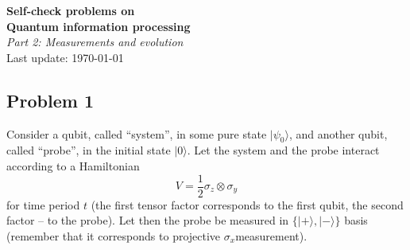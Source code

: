 \documentclass[a4paper,10pt]{article}
\newcommand{\ket}[1]{|#1\rangle}
\begin{document}
\begin{center}
\Large{{\bf Self-check problems on\\  Quantum information processing}\\{\it Part 2: Measurements and evolution}}\\
\vspace{5pt}
\large{Last update: \today}
\end{center}

\subsection*{Problem 1}
Consider a qubit, called ``system'', in some pure state $\ket{\psi_{0}}$, and another qubit, called ``probe'', in the initial state $\ket{0}$.
Let the system and the probe interact according to a Hamiltonian 
\begin{equation}
	V=\frac{1}{2}\sigma_{z}\otimes\sigma_{y}
\end{equation} 
for time period $t$ (the first tensor factor corresponds to the first qubit, the second factor -- to the probe).
Let then the probe be measured in $\{\ket{+}, \ket{-}\}$ basis (remember that it corresponds to projective $\sigma_{x}$measurement).
\end{document}
